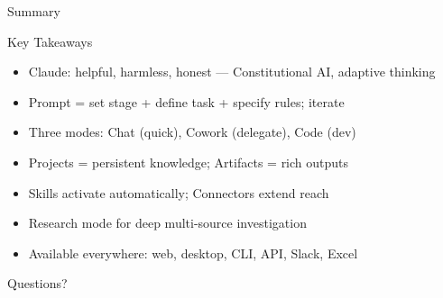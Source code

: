 \documentclass[aspectratio=169]{beamer}
\begin{document}
\begin{frame}{Summary}
\begin{block}{Key Takeaways}
\begin{itemize}
  \item Claude: helpful, harmless, honest --- Constitutional AI, adaptive thinking
  \item Prompt = set stage + define task + specify rules; iterate
  \item Three modes: Chat (quick), Cowork (delegate), Code (dev)
  \item Projects = persistent knowledge; Artifacts = rich outputs
  \item Skills activate automatically; Connectors extend reach
  \item Research mode for deep multi-source investigation
  \item Available everywhere: web, desktop, CLI, API, Slack, Excel
\end{itemize}
\end{block}

\vfill
\centering
\Large\color{popblue} Questions?
\end{frame}
\end{document}

